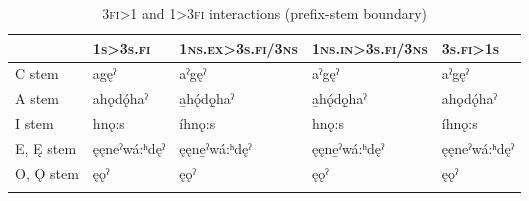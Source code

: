\begin{table}[p!]
\caption{\textsc{3fi>1} and \textsc{1>3fi} interactions (prefix-stem boundary)}
\label{figtab:1-3.end}
{\small
\begin{tabularx}{\textwidth}{lQQQQ}
\lsptoprule
&\textsc{1s>3s.fi}&\textsc{1ns.ex>3s.fi/3ns}&\textsc{1ns.in>3s.fi/3ns}&\textsc{3s.fi>1s}\\
\midrule
C stem&

agęˀ&

aˀgęˀ&

aˀgęˀ&

aˀgęˀ\\
\tablevspace
A stem&

ahǫdǫ́haˀ &

a̱hǫ́dǫ̱haˀ&

a̱hǫ́dǫ̱haˀ&

ahǫdǫ́haˀ\\
\tablevspace
I stem&

hnǫ:s&

íhnǫ:s&

hnǫ:s&

íhnǫ:s\\
\tablevspace
E, Ę stem&

ęęneˀ\-wá:ʰdęˀ&

ęęne̱\-ˀwá:ʰdęˀ&

ęęne̱ˀ\-wá:ʰdęˀ&

ęęneˀ\-wá:ʰdęˀ\\
\tablevspace
O, Ǫ stem&

ęǫˀ&

ęǫˀ&

ęǫˀ&

ęǫˀ\\
\lspbottomrule
\end{tabularx}}
\end{table}


